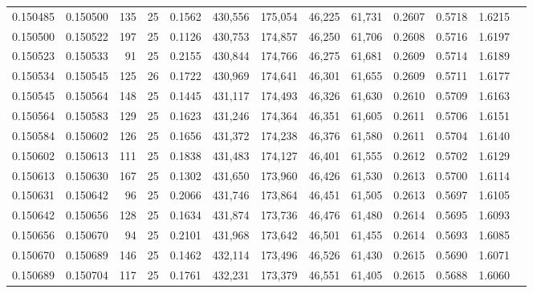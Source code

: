 \begin{tabular}{rrrrrrrrrrrrr}
0.150485 & 0.150500 &   135 &  25 &                                     0.1562 & 430,556 & 175,054 &  46,225 &  61,731 & 0.2607 & 0.5718 & 1.6215 \\
0.150500 & 0.150522 &   197 &  25 &                                     0.1126 & 430,753 & 174,857 &  46,250 &  61,706 & 0.2608 & 0.5716 & 1.6197 \\
0.150523 & 0.150533 &    91 &  25 &                                     0.2155 & 430,844 & 174,766 &  46,275 &  61,681 & 0.2609 & 0.5714 & 1.6189 \\
0.150534 & 0.150545 &   125 &  26 &                                     0.1722 & 430,969 & 174,641 &  46,301 &  61,655 & 0.2609 & 0.5711 & 1.6177 \\
0.150545 & 0.150564 &   148 &  25 &                                     0.1445 & 431,117 & 174,493 &  46,326 &  61,630 & 0.2610 & 0.5709 & 1.6163 \\
0.150564 & 0.150583 &   129 &  25 &                                     0.1623 & 431,246 & 174,364 &  46,351 &  61,605 & 0.2611 & 0.5706 & 1.6151 \\
0.150584 & 0.150602 &   126 &  25 &                                     0.1656 & 431,372 & 174,238 &  46,376 &  61,580 & 0.2611 & 0.5704 & 1.6140 \\
0.150602 & 0.150613 &   111 &  25 &                                     0.1838 & 431,483 & 174,127 &  46,401 &  61,555 & 0.2612 & 0.5702 & 1.6129 \\
0.150613 & 0.150630 &   167 &  25 &                                     0.1302 & 431,650 & 173,960 &  46,426 &  61,530 & 0.2613 & 0.5700 & 1.6114 \\
0.150631 & 0.150642 &    96 &  25 &                                     0.2066 & 431,746 & 173,864 &  46,451 &  61,505 & 0.2613 & 0.5697 & 1.6105 \\
0.150642 & 0.150656 &   128 &  25 &                                     0.1634 & 431,874 & 173,736 &  46,476 &  61,480 & 0.2614 & 0.5695 & 1.6093 \\
0.150656 & 0.150670 &    94 &  25 &                                     0.2101 & 431,968 & 173,642 &  46,501 &  61,455 & 0.2614 & 0.5693 & 1.6085 \\
0.150670 & 0.150689 &   146 &  25 &                                     0.1462 & 432,114 & 173,496 &  46,526 &  61,430 & 0.2615 & 0.5690 & 1.6071 \\
0.150689 & 0.150704 &   117 &  25 &                                     0.1761 & 432,231 & 173,379 &  46,551 &  61,405 & 0.2615 & 0.5688 & 1.6060 \\

\end{tabular}
